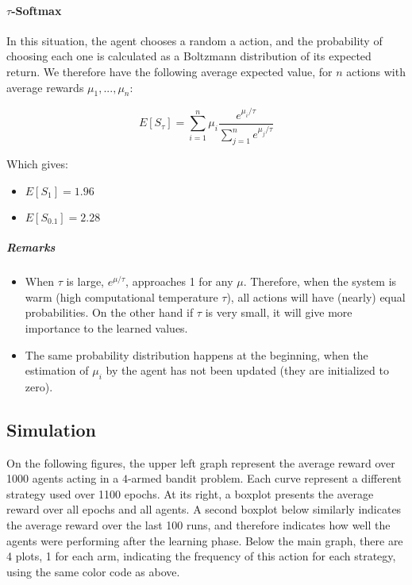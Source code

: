 \documentclass[a4paper,11pt]{article}
\begin{document}
\paragraph{$\tau$-Softmax}
In this situation, the agent chooses a random a action, and the probability of choosing each one is calculated as a Boltzmann distribution of its expected return. We therefore have the following average expected value, for $n$ actions with average rewards $\mu_1, ..., \mu_{n}$:

\begin{equation}
E[S_{\tau}] = \sum_{i=1}^{n} \mu_{i} \frac{e^{\mu_i/\tau}}{\sum_{j=1}^{n} e^{\mu_j/\tau}}
\label{eq:softmax}
\end{equation}

Which gives:
\begin{itemize}
  \item{$ E[S_{1}] = 1.96 $}
  \item{$ E[S_{0.1}] = 2.28 $}
\end{itemize}

\subparagraph{Remarks}
\begin{itemize}
  \item When $\tau$ is large, $e^{\mu/\tau}$, approaches 1 for any $\mu$. Therefore, when the system is warm (high computational temperature $\tau$), all actions will have (nearly) equal probabilities. On the other hand if $\tau$ is very small, it  will give more importance to the learned values.
  \item The same probability distribution happens at the beginning, when the estimation of $\mu_i$ by the agent has not been updated (they are initialized to zero).
\end{itemize}

\subsection{Simulation}
On the following figures, the upper left graph represent the average reward over 1000 agents acting in a $4$-armed bandit problem. Each curve represent a different strategy used over 1100 epochs. At its right, a boxplot presents the average reward over all epochs and all agents. A second boxplot below similarly indicates the average reward over the last 100 runs, and therefore indicates how well the agents were performing after the learning phase. Below the main graph, there are 4 plots, 1 for each arm, indicating the frequency of this action for each strategy, using the same color code as above.
\end{document}
